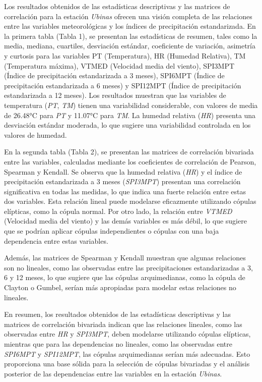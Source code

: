 \begin{figure}[htbp]
\end{figure}




Los resultados obtenidos de las estadísticas descriptivas y las matrices de correlación para la estación \textit{Ubinas} ofrecen una visión completa de las relaciones entre las variables meteorológicas y los índices de precipitación estandarizada. En la primera tabla (Tabla 1), se presentan las estadísticas de resumen, tales como la media, mediana, cuartiles, desviación estándar, coeficiente de variación, asimetría y curtosis para las variables PT (Temperatura), HR (Humedad Relativa), TM (Temperatura máxima), VTMED (Velocidad media del viento), SPI3MPT (Índice de precipitación estandarizada a 3 meses), SPI6MPT (Índice de precipitación estandarizada a 6 meses) y SPI12MPT (Índice de precipitación estandarizada a 12 meses). Los resultados muestran que las variables de temperatura (\textit{PT}, \textit{TM}) tienen una variabilidad considerable, con valores de media de 26.48°C para \textit{PT} y 11.07°C para \textit{TM}. La humedad relativa (\textit{HR}) presenta una desviación estándar moderada, lo que sugiere una variabilidad controlada en los valores de humedad. 

En la segunda tabla (Tabla 2), se presentan las matrices de correlación bivariada entre las variables, calculadas mediante los coeficientes de correlación de Pearson, Spearman y Kendall. Se observa que la humedad relativa (\textit{HR}) y el índice de precipitación estandarizada a 3 meses (\textit{SPI3MPT}) presentan una correlación significativa en todas las medidas, lo que indica una fuerte relación entre estas dos variables. Esta relación lineal puede modelarse eficazmente utilizando cópulas elípticas, como la cópula normal. Por otro lado, la relación entre \textit{VTMED} (Velocidad media del viento) y las demás variables es más débil, lo que sugiere que se podrían aplicar cópulas independientes o cópulas con una baja dependencia entre estas variables.

Además, las matrices de Spearman y Kendall muestran que algunas relaciones son no lineales, como las observadas entre las precipitaciones estandarizadas a 3, 6 y 12 meses, lo que sugiere que las cópulas arquimedianas, como la cópula de Clayton o Gumbel, serían más apropiadas para modelar estas relaciones no lineales.

En resumen, los resultados obtenidos de las estadísticas descriptivas y las matrices de correlación bivariada indican que las relaciones lineales, como las observadas entre \textit{HR} y \textit{SPI3MPT}, deben modelarse utilizando cópulas elípticas, mientras que para las dependencias no lineales, como las observadas entre \textit{SPI6MPT} y \textit{SPI12MPT}, las cópulas arquimedianas serían más adecuadas. Esto proporciona una base sólida para la selección de cópulas bivariadas y el análisis posterior de las dependencias entre las variables en la estación \textit{Ubinas}.


